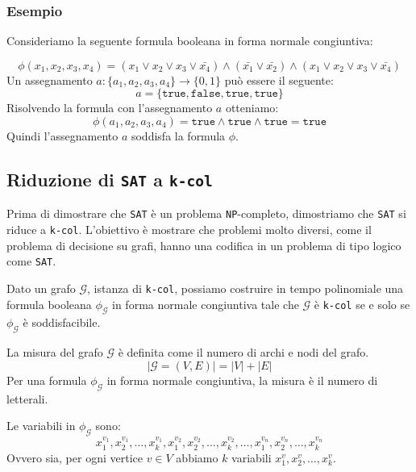 \subsubsection{Esempio}
Consideriamo la seguente formula booleana in forma normale congiuntiva:

\[
\phi(x_1, x_2, x_3, x_4) = (x_1 \lor x_2 \lor x_3 \lor \bar{x_4}) \land 
(\bar{x_1} \lor \bar{x_2}) \land (x_1 \lor x_2 \lor x_3 \lor \bar{x_4})
\]
Un assegnamento $a: \{a_1, a_2, a_3, a_4\} \to \{0, 1\}$ può essere il seguente:
\[
a = \{\texttt{true}, \texttt{false}, \texttt{true}, \texttt{true}\}
\]
Risolvendo la formula con l'assegnamento $a$ otteniamo:
\[
\phi(a_1, a_2, a_3, a_4) = \texttt{true} \land \texttt{true} \land \texttt{true} = \texttt{true}
\]
Quindi l'assegnamento $a$ soddisfa la formula $\phi$.

\subsection{Riduzione di \texttt{SAT} a \texttt{k-col}}
Prima di dimostrare che \texttt{SAT} è un problema \texttt{NP}-completo, dimostriamo
che \texttt{SAT} si riduce a \texttt{k-col}. L'obiettivo è mostrare che problemi molto 
diversi, come il problema di decisione su grafi, hanno una codifica in un problema 
di tipo logico come \texttt{SAT}.
\begin{tcolorbox}
    Dato un grafo $\mathcal{G}$, istanza di \texttt{k-col}, possiamo costruire in 
    tempo polinomiale una formula booleana $\phi_\mathcal{G}$ in forma normale congiuntiva
    tale che $\mathcal{G}$ è \texttt{k-col} se e solo se $\phi_\mathcal{G}$ è soddisfacibile.
\end{tcolorbox}
La misura del grafo $\mathcal{G}$ è definita come il numero di archi e nodi del grafo.
\[
    |\mathcal{G}=(V, E)| = |V| + |E|  
\]
Per una formula $\phi_\mathcal{G}$ in forma normale congiuntiva, la misura è il numero
    di letterali.

    Le variabili in $\phi_\mathcal{G}$ sono:
    \[
        x_1^{v_1}, x_2^{v_1}, \dots, x_k^{v_1}, x_1^{v_2},
        x_2^{v_2}, \dots, x_k^{v_2}, \dots, x_1^{v_n}, x_2^{v_n}, \dots, x_k^{v_n}
    \]
    Ovvero sia, per ogni vertice $v \in V$ abbiamo $k$ variabili $x_1^v, x_2^v, \dots, x_k^v$.
    

